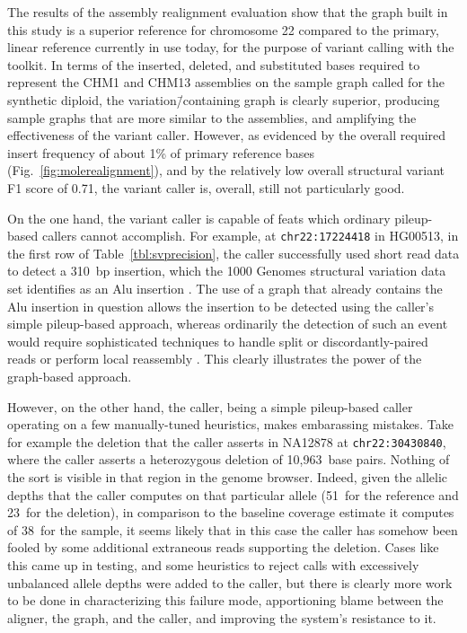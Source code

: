 The results of the assembly realignment evaluation show that the graph built in this study is a superior reference for chromosome 22 compared to the primary, linear reference currently in use today, for the purpose of variant calling with the \vg toolkit. In terms of the inserted, deleted, and substituted bases required to represent the CHM1 and CHM13 assemblies on the sample graph called for the synthetic diploid, the variation\=/containing graph is clearly superior, producing sample graphs that are more similar to the assemblies, and amplifying the effectiveness of the variant caller. However, as evidenced by the overall required insert frequency of about 1\% of primary reference bases (Fig.~\ref{fig:molerealignment}), and by the relatively low overall structural variant F1 score of 0.71, the \vg variant caller is, overall, still not particularly good.

On the one hand, the \vg variant caller is capable of feats which ordinary pileup-based callers cannot accomplish. For example, at \texttt{chr22:17224418} in HG00513, in the first row of Table~\ref{tbl:svprecision}, the \vg caller successfully used short read data to detect a 310~bp insertion, which the 1000 Genomes structural variation data set identifies as an Alu insertion \cite{sudmant2015integrated}. The use of a graph that already contains the Alu insertion in question allows the insertion to be detected using the \vg caller's simple pileup-based approach, whereas ordinarily the detection of such an event would require sophisticated techniques to handle split or discordantly-paired reads or perform local reassembly \cite{wildschutte2015discovery}. This clearly illustrates the power of the graph-based approach.


However, on the other hand, the \vg caller, being a simple pileup-based caller operating on a few manually-tuned heuristics, makes embarassing mistakes. Take for example the deletion that the caller asserts in NA12878 at \texttt{chr22:30430840}, where the caller asserts a heterozygous deletion of 10,963~base pairs. Nothing of the sort is visible in that region in the genome browser. Indeed, given the allelic depths that the caller computes on that particular allele (51~for the reference and 23~for the deletion), in comparison to the baseline coverage estimate it computes of 38~for the sample, it seems likely that in this case the caller has somehow been fooled by some additional extraneous reads supporting the deletion. Cases like this came up in testing, and some heuristics to reject calls with excessively unbalanced allele depths were added to the caller, but there is clearly more work to be done in characterizing this failure mode, apportioning blame between the aligner, the graph, and the caller, and improving the system's resistance to it.

